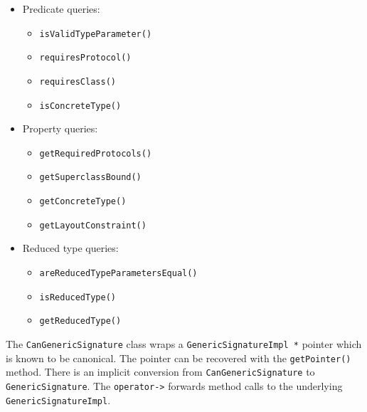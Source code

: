 \documentclass[../generics]{subfiles}
\begin{document}
\begin{itemize}
\item Predicate queries:
\begin{itemize}
\item \texttt{isValidTypeParameter()}
\item \texttt{requiresProtocol()}
\item \texttt{requiresClass()}
\item \texttt{isConcreteType()}
\end{itemize}
\item Property queries:
\begin{itemize}
\item \texttt{getRequiredProtocols()}
\item \texttt{getSuperclassBound()}
\item \texttt{getConcreteType()}
\item \texttt{getLayoutConstraint()}
\end{itemize}
\item Reduced type queries:
\begin{itemize}
\item \texttt{areReducedTypeParametersEqual()}
\item \texttt{isReducedType()}
\item \texttt{getReducedType()}
\end{itemize}
\end{itemize}

The \texttt{CanGenericSignature} class wraps a \texttt{GenericSignatureImpl *} pointer which is known to be canonical. The pointer can be recovered with the \texttt{getPointer()} method. There is an implicit conversion from \texttt{CanGenericSignature} to \texttt{GenericSignature}. The \texttt{operator->} forwards method calls to the underlying \texttt{GenericSignatureImpl}.
\end{document}
